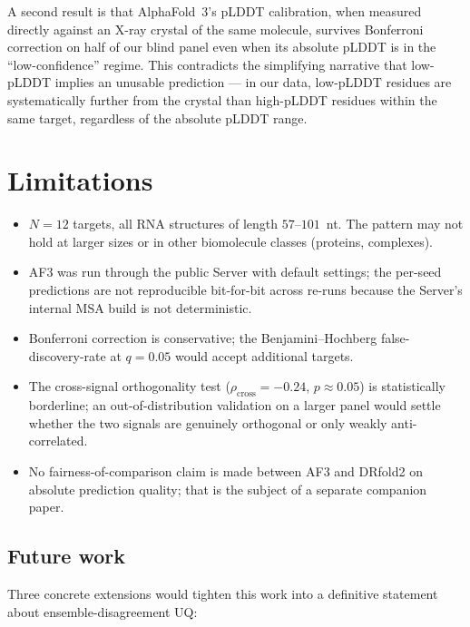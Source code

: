 \documentclass[conference,10pt]{IEEEtran}
\begin{document}
A second result is that AlphaFold~3's pLDDT calibration, when
measured directly against an X-ray crystal of the same molecule,
survives Bonferroni correction on half of our blind panel even when
its absolute pLDDT is in the ``low-confidence'' regime. This
contradicts the simplifying narrative that low-pLDDT implies an
unusable prediction --- in our data, low-pLDDT residues are
systematically further from the crystal than high-pLDDT residues
within the same target, regardless of the absolute pLDDT range.

\section{Limitations}

\begin{itemize}
\item $N=12$ targets, all RNA structures of length $57$--$101$~nt.
The pattern may not hold at larger sizes or in other biomolecule
classes (proteins, complexes).
\item AF3 was run through the public Server with default settings;
the per-seed predictions are not reproducible bit-for-bit across
re-runs because the Server's internal MSA build is not deterministic.
\item Bonferroni correction is conservative; the
Benjamini--Hochberg false-discovery-rate at $q=0.05$ would
accept additional targets.
\item The cross-signal orthogonality test ($\rho_{\text{cross}} =
-0.24$, $p \approx 0.05$) is statistically borderline; an
out-of-distribution validation on a larger panel would settle
whether the two signals are genuinely orthogonal or only
weakly anti-correlated.
\item No fairness-of-comparison claim is made between AF3 and
DRfold2 on absolute prediction quality; that is the subject of a
separate companion paper.
\end{itemize}

\subsection{Future work}

Three concrete extensions would tighten this work into a definitive
statement about ensemble-disagreement UQ:
\end{document}
